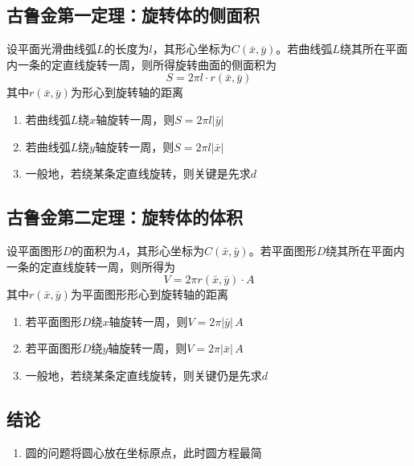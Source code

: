 \documentclass[../book.tex]{subfiles}
\begin{document}
    \subsection{古鲁金第一定理：旋转体的侧面积}

    设平面光滑曲线弧$L$的长度为$l$，其形心坐标为$C(\bar{x}, \bar{y})$。若曲线弧$L$绕其所在平面内一条{\color{red}{不与曲线弧相交}}的定直线旋转一周，则所得旋转曲面的侧面积为
    \[
        S = 2\pi l \cdot r(\bar{x}, \bar{y})
    \]
    其中$r(\bar{x}, \bar{y})$为形心到旋转轴的距离

    \medskip
    \begin{enumerate}
        \item 若曲线弧$L$绕$x$轴旋转一周，则$S = 2\pi l |\bar{y}|$
        \item 若曲线弧$L$绕$y$轴旋转一周，则$S = 2\pi l |\bar{x}|$
        \item 一般地，若绕某条定直线旋转，则关键是先求{\color{red}{形心到该直线的距离}}$d$
    \end{enumerate}

    \subsection{古鲁金第二定理：旋转体的体积}

    设平面图形$D$的面积为$A$，其形心坐标为$C(\bar{x}, \bar{y})$。若平面图形$D$绕其所在平面内一条{\color{red}{不与该图形相交}}的定直线旋转一周，则所得{\color{red}{旋转体的体积}}为
    \[
        V = 2\pi r(\bar{x}, \bar{y})\cdot A
    \]
    其中$r(\bar{x}, \bar{y})$为平面图形形心到旋转轴的距离

    \medskip
    \begin{enumerate}
        \item 若平面图形$D$绕$x$轴旋转一周，则$V = 2\pi |\bar{y}|\,A$
        \item 若平面图形$D$绕$y$轴旋转一周，则$V = 2\pi |\bar{x}|\,A$
        \item 一般地，若绕某条定直线旋转，则关键仍是先求{\color{red}{形心到旋转轴的距离}}$d$
    \end{enumerate}

    \subsection{结论}

    \begin{enumerate}
        \item 圆的问题将圆心放在坐标原点，此时圆方程最简
    \end{enumerate}
\end{document}
